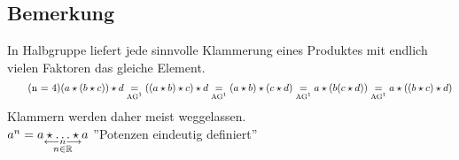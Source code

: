 \subsection{Bemerkung}\label{sec:1.4}
In Halbgruppe liefert jede sinnvolle Klammerung eines Produktes mit endlich vielen Faktoren das gleiche Element.\\
\begin{equation}
\tag{n = 4}
(a \star (b \star c)) \star d \underset{\text{AG\footnotemark[1]}}{=} ((a \star b)\star c)\star d \underset{\text{AG\footnotemark[1]}}{=} (a \star b) \star (c \star d) \underset{\text{AG\footnotemark[1]}}{=} a \star (b (c \star d)) \underset{\text{AG\footnotemark}}{=} a \star ((b \star c)\star d)
\end{equation}
Klammern werden daher meist weggelassen.\\
$a^n = \underset{\substack{\longleftarrow n \longrightarrow\\
n \in \mathbb{R}}}{a\star\ldots\star a}$ ''Potenzen eindeutig definiert''

